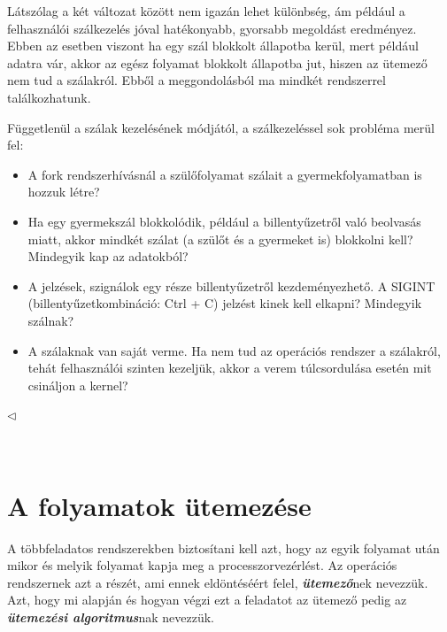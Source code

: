 \documentclass[tikz,12pt,margin=0px]{article}
\begin{document}
    \noindent Látszólag a két változat között nem igazán lehet különbség, ám például a felhasználói szálkezelés jóval hatékonyabb, gyorsabb megoldást eredményez. Ebben az esetben viszont ha egy szál blokkolt állapotba kerül, mert például adatra vár, akkor az egész folyamat blokkolt állapotba jut, hiszen az ütemező nem tud a szálakról. Ebből a meggondolásból ma mindkét rendszerrel találkozhatunk.\\

    {\footnotesize \noindent {\color{blue} \faLightbulbO\ $\triangleright$ } }
    {\footnotesize

    \noindent Függetlenül a szálak kezelésének módjától, a szálkezeléssel sok probléma merül fel:\\

    \begin{itemize}[topsep=8pt,itemsep=4pt,partopsep=4pt, parsep=4pt]
        \item A fork rendszerhívásnál a szülőfolyamat szálait a gyermekfolyamatban is hozzuk létre?
        \item Ha egy gyermekszál blokkolódik, például a billentyűzetről való beolvasás miatt, akkor mindkét szálat (a szülőt és a gyermeket is) blokkolni kell? Mindegyik kap az adatokból?
        \item A jelzések, szignálok egy része billentyűzetről kezdeményezhető. A SIGINT (billentyűzetkombináció: Ctrl + C) jelzést kinek kell elkapni? Mindegyik szálnak?
        \item A szálaknak van saját verme. Ha nem tud az operációs rendszer a szálakról, tehát felhasználói szinten kezeljük, akkor a verem túlcsordulása esetén mit csináljon a kernel?
    \end{itemize}
    $\triangleleft$ \faLightbulbO}\\

    \section*{A folyamatok ütemezése}

    \noindent A többfeladatos rendszerekben biztosítani kell azt, hogy az egyik folyamat után mikor és melyik folyamat kapja meg a processzorvezérlést. Az operációs rendszernek azt a részét, ami ennek eldöntéséért felel, \textbf{\emph{ütemező}}nek nevezzük. Azt, hogy mi alapján és hogyan végzi ezt a feladatot az ütemező pedig az \emph{\textbf{ütemezési algoritmus}}nak nevezzük.\\
\end{document}
